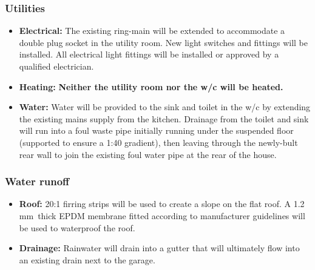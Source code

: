 \documentclass{extension}
\newcommand{\mm}{\,$\mathrm{mm}$}
\begin{document}
\subsubsection{Utilities}
\begin{itemize}

  \item {\bf Electrical:} The existing ring-main will be extended to accommodate a double plug socket in the utility room. New light switches and fittings will be installed. All electrical light fittings will be installed or approved by a qualified electrician.
  \item {\bf Heating:} {\bf Neither the utility room nor the w/c will be heated.}
  \item {\bf Water:} Water will be provided to the sink and toilet in the w/c by extending the existing mains supply from the kitchen. Drainage from the toilet and sink will run into a foul waste pipe initially running under the suspended floor (supported to ensure a 1:40 gradient), then leaving through the newly-bult rear wall to join the existing foul water pipe at the rear of the house.
\end{itemize}

\subsubsection{Water runoff}
\begin{itemize}
  \item {\bf Roof:} 20:1 firring strips will be used to create a slope on the flat roof. A 1.2\mm\ thick EPDM membrane\cite{prmem} fitted according to manufacturer guidelines will be used to waterproof the roof.
  \item {\bf Drainage:} Rainwater will drain into a gutter that will ultimately flow into an existing drain next to the garage.
\end{itemize}
\end{document}
